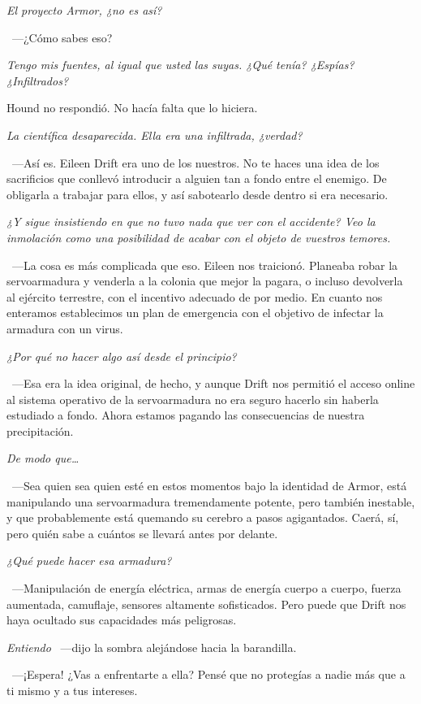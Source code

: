 \emph{El proyecto Armor, ¿no es así?}

~---¿Cómo sabes eso?

\emph{Tengo mis fuentes, al igual que usted las suyas. ¿Qué tenía? ¿Espías? ¿Infiltrados?}

Hound no respondió. No hacía falta que lo hiciera.

\emph{La científica desaparecida. Ella era una infiltrada, ¿verdad?}

~---Así es. Eileen Drift era uno de los nuestros. No te haces una idea de los sacrificios que conllevó introducir a alguien tan a fondo entre el enemigo. De obligarla a trabajar para ellos, y así sabotearlo desde dentro si era necesario.

\emph{¿Y sigue insistiendo en que no tuvo nada que ver con el accidente? Veo la inmolación como una posibilidad de acabar con el objeto de vuestros temores.}

~---La cosa es más complicada que eso. Eileen nos traicionó. Planeaba robar la servoarmadura y venderla a la colonia que mejor la pagara, o incluso devolverla al ejército terrestre, con el incentivo adecuado de por medio. En cuanto nos enteramos establecimos un plan de emergencia con el objetivo de infectar la armadura con un virus.

\emph{¿Por qué no hacer algo así desde el principio?}

~---Esa era la idea original, de hecho, y aunque Drift nos permitió el acceso online al sistema operativo de la servoarmadura no era seguro hacerlo sin haberla estudiado a fondo. Ahora estamos pagando las consecuencias de nuestra precipitación.

\emph{De modo que\dots}

~---Sea quien sea quien esté en estos momentos bajo la identidad de Armor, está manipulando una servoarmadura tremendamente potente, pero también inestable, y que probablemente está quemando su cerebro a pasos agigantados. Caerá, sí, pero quién sabe a cuántos se llevará antes por delante.

\emph{¿Qué puede hacer esa armadura?}

~---Manipulación de energía eléctrica, armas de energía cuerpo a cuerpo, fuerza aumentada, camuflaje, sensores altamente sofisticados. Pero puede que Drift nos haya ocultado sus capacidades más peligrosas.

\emph{Entiendo} ~---dijo la sombra alejándose hacia la barandilla.

~---¡Espera! ¿Vas a enfrentarte a ella? Pensé que no protegías a nadie más que a ti mismo y a tus intereses.


